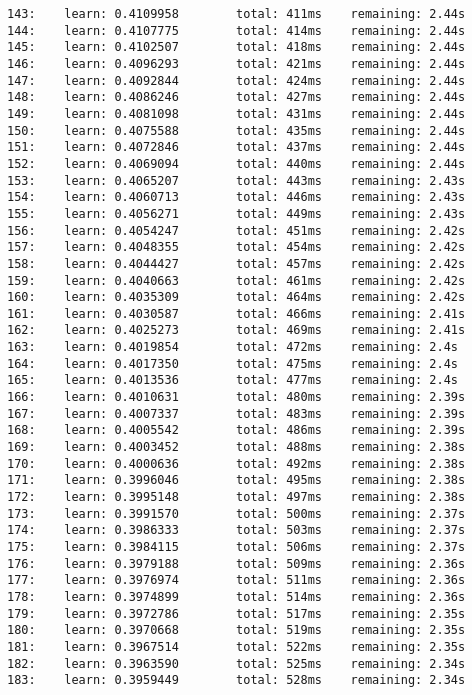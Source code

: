 \documentclass[11pt]{article}
\begin{document}
\begin{Verbatim}[commandchars=\\\{\}]
143:    learn: 0.4109958        total: 411ms    remaining: 2.44s
144:    learn: 0.4107775        total: 414ms    remaining: 2.44s
145:    learn: 0.4102507        total: 418ms    remaining: 2.44s
146:    learn: 0.4096293        total: 421ms    remaining: 2.44s
147:    learn: 0.4092844        total: 424ms    remaining: 2.44s
148:    learn: 0.4086246        total: 427ms    remaining: 2.44s
149:    learn: 0.4081098        total: 431ms    remaining: 2.44s
150:    learn: 0.4075588        total: 435ms    remaining: 2.44s
151:    learn: 0.4072846        total: 437ms    remaining: 2.44s
152:    learn: 0.4069094        total: 440ms    remaining: 2.44s
153:    learn: 0.4065207        total: 443ms    remaining: 2.43s
154:    learn: 0.4060713        total: 446ms    remaining: 2.43s
155:    learn: 0.4056271        total: 449ms    remaining: 2.43s
156:    learn: 0.4054247        total: 451ms    remaining: 2.42s
157:    learn: 0.4048355        total: 454ms    remaining: 2.42s
158:    learn: 0.4044427        total: 457ms    remaining: 2.42s
159:    learn: 0.4040663        total: 461ms    remaining: 2.42s
160:    learn: 0.4035309        total: 464ms    remaining: 2.42s
161:    learn: 0.4030587        total: 466ms    remaining: 2.41s
162:    learn: 0.4025273        total: 469ms    remaining: 2.41s
163:    learn: 0.4019854        total: 472ms    remaining: 2.4s
164:    learn: 0.4017350        total: 475ms    remaining: 2.4s
165:    learn: 0.4013536        total: 477ms    remaining: 2.4s
166:    learn: 0.4010631        total: 480ms    remaining: 2.39s
167:    learn: 0.4007337        total: 483ms    remaining: 2.39s
168:    learn: 0.4005542        total: 486ms    remaining: 2.39s
169:    learn: 0.4003452        total: 488ms    remaining: 2.38s
170:    learn: 0.4000636        total: 492ms    remaining: 2.38s
171:    learn: 0.3996046        total: 495ms    remaining: 2.38s
172:    learn: 0.3995148        total: 497ms    remaining: 2.38s
173:    learn: 0.3991570        total: 500ms    remaining: 2.37s
174:    learn: 0.3986333        total: 503ms    remaining: 2.37s
175:    learn: 0.3984115        total: 506ms    remaining: 2.37s
176:    learn: 0.3979188        total: 509ms    remaining: 2.36s
177:    learn: 0.3976974        total: 511ms    remaining: 2.36s
178:    learn: 0.3974899        total: 514ms    remaining: 2.36s
179:    learn: 0.3972786        total: 517ms    remaining: 2.35s
180:    learn: 0.3970668        total: 519ms    remaining: 2.35s
181:    learn: 0.3967514        total: 522ms    remaining: 2.35s
182:    learn: 0.3963590        total: 525ms    remaining: 2.34s
183:    learn: 0.3959449        total: 528ms    remaining: 2.34s

\end{Verbatim}
\end{document}
